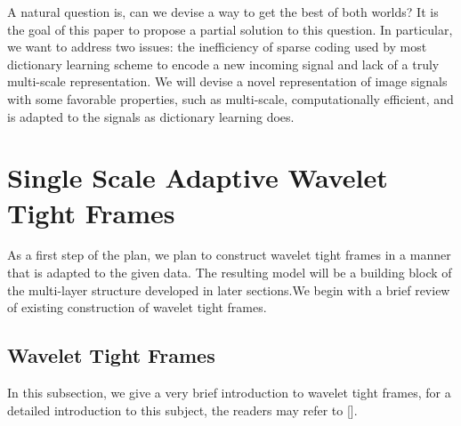 \documentclass[a4paper]{article}
\begin{document}
A natural question is, can we devise a way to get the best of both worlds? It is the goal of this paper to propose a partial solution to this question. In particular, we want to address two issues: the inefficiency of sparse coding used by most dictionary learning scheme to encode a new incoming signal and lack of a truly multi-scale representation. We will devise a novel representation of image signals with some favorable properties, such as multi-scale, computationally efficient, and is adapted to the signals as dictionary learning does.

\section{Single Scale Adaptive Wavelet Tight Frames}
As a first step of the plan, we plan to construct wavelet tight frames in a manner that is adapted to the given data. The resulting model will be a building block of the multi-layer structure developed in later sections.We begin with a brief review of existing construction of wavelet tight frames.

\subsection{Wavelet Tight Frames}
In this subsection, we give a very brief introduction to wavelet tight frames, for a detailed introduction to this subject, the readers may refer to [].
\end{document}

